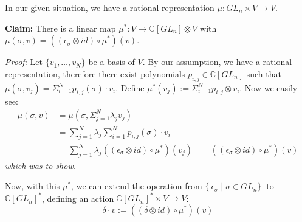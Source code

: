 \documentclass{article}
\begin{document}
\smallskip
In our given situation, we have a rational representation $\mu : GL_n \times V \longrightarrow V$.

\textbf{Claim:} There is a linear map $\mu^\ast : V \longrightarrow \mathbb{C}[GL_n] \otimes V$ with $ \mu \left( \sigma , v \right) = \left( \left( \epsilon_\sigma \otimes id \right) \circ \mu^\ast \right) \left(v\right)$.

\textit{Proof:} Let $\{ v_1 , \ldots , v_N \}$ be a basis of $V$.
By our assumption, we have a rational representation, therefore there exist polynomials $p_{i,j} \in \mathbb{C}[GL_n]$ such that $\mu\left( \sigma, v_j \right) = \Sigma_{i=1}^{N} p_{i,j}\left(\sigma\right) \cdot v_i$.
Define $\mu^\ast \left( v_j \right) := \Sigma_{i=1}^{N} p_{i,j} \otimes v_i$.
Now we easily see:
\begin{equation}
  \begin{aligned}
    \mu\left(\sigma,v\right)
    &= \mu \left(\sigma, \Sigma_{j=1}^N \lambda_j v_j \right) \\
    &= \sum_{j=1}^N \lambda_j  \sum_{i=1}^N p_{i,j}\left(\sigma\right) \cdot v_i \\
    &= \sum_{j=1}^N \lambda_j \left(\left(\epsilon_\sigma \otimes id \right) \circ \mu^\ast \right) \left(v_j \right)
    &= \left(\left(\epsilon_\sigma \otimes id \right) \circ \mu^\ast \right) \left(v \right)
  \end{aligned}
\end{equation}
\textit{which was to show.}

\smallskip
Now, with this $\mu^\ast$, we can extend the operation from $\{\ \epsilon_\sigma \mid \sigma \in GL_n \}\ $ to $\mathbb{C}[GL_n]^\ast$, defining an action $\mathbb{C}[GL_n]^\ast \times V \longrightarrow V$:
\begin{equation}
  \delta \cdot v := \left(\left( \delta \otimes id \right) \circ \mu^\ast \right) \left(v\right)
\end{equation}
\end{document}
